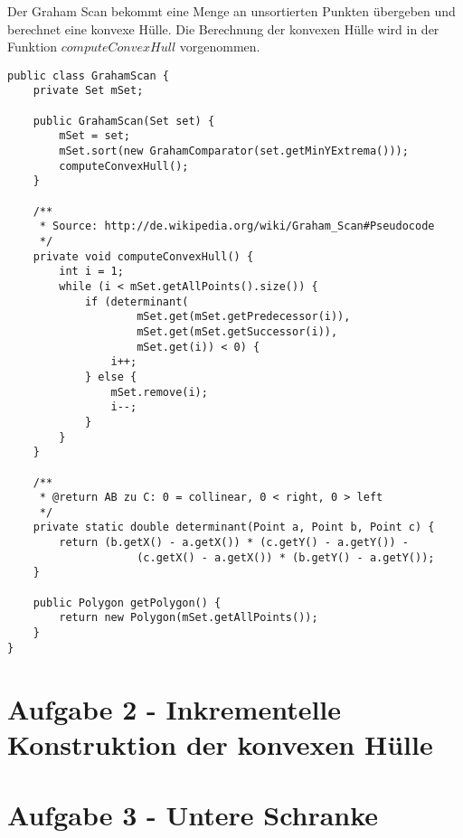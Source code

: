 \documentclass[a4paper]{article}
\begin{document}
Der Graham Scan bekommt eine Menge an unsortierten Punkten übergeben und berechnet eine konvexe Hülle. Die Berechnung der konvexen Hülle wird in der Funktion $computeConvexHull$ vorgenommen.

\begin{lstlisting}
public class GrahamScan {
    private Set mSet;

    public GrahamScan(Set set) {
        mSet = set;
        mSet.sort(new GrahamComparator(set.getMinYExtrema()));
        computeConvexHull();
    }

    /**
     * Source: http://de.wikipedia.org/wiki/Graham_Scan#Pseudocode
     */
    private void computeConvexHull() {
        int i = 1;
        while (i < mSet.getAllPoints().size()) {
            if (determinant(
                    mSet.get(mSet.getPredecessor(i)),
                    mSet.get(mSet.getSuccessor(i)),
                    mSet.get(i)) < 0) {
                i++;
            } else {
                mSet.remove(i);
                i--;
            }
        }
    }

    /**
     * @return AB zu C: 0 = collinear, 0 < right, 0 > left
     */
    private static double determinant(Point a, Point b, Point c) {
        return (b.getX() - a.getX()) * (c.getY() - a.getY()) -
                    (c.getX() - a.getX()) * (b.getY() - a.getY());
    }

    public Polygon getPolygon() {
        return new Polygon(mSet.getAllPoints());
    }
}
\end{lstlisting}


\section*{Aufgabe 2 - Inkrementelle Konstruktion der konvexen Hülle}



\section*{Aufgabe 3 - Untere Schranke}
\end{document}
